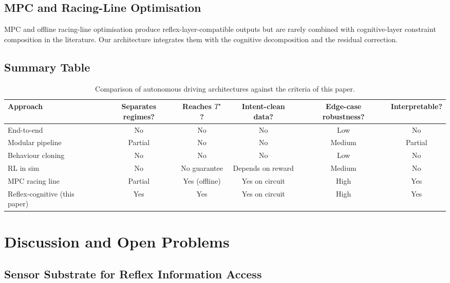 \documentclass[11pt,twocolumn]{article}
\theoremstyle{definition}
\theoremstyle{remark}
\begin{document}
\subsection{MPC and Racing-Line Optimisation}

MPC \cite{kelly2008controlvehicle,liniger2015optimization,rosolia2019learning} and offline racing-line optimisation \cite{casanova2000minimum,perantoni2014optimal,tremlett2015minimum,velenis2008minimum,aftalion2014train} produce reflex-layer-compatible outputs but are rarely combined with cognitive-layer constraint composition in the literature. Our architecture integrates them with the cognitive decomposition and the residual correction.

\subsection{Summary Table}

\begin{table}[tb]
\centering
\caption{Comparison of autonomous driving architectures against the criteria of this paper.}
\label{tab:compare}
\begin{tabular}{lccccc}
\toprule
Approach & Separates regimes? & Reaches $T^{\star}$? & Intent-clean data? & Edge-case robustness? & Interpretable? \\
\midrule
End-to-end \cite{bojarski2016endtoend} & No & No & No & Low & No \\
Modular pipeline \cite{urmson2008boss} & Partial & No & No & Medium & Partial \\
Behaviour cloning \cite{codevilla2018endtoend} & No & No & No & Low & No \\
RL in sim \cite{kendall2019learning} & No & No guarantee & Depends on reward & Medium & No \\
MPC racing line \cite{perantoni2014optimal} & Partial & Yes (offline) & Yes on circuit & High & Yes \\
Reflex-cognitive (this paper) & Yes & Yes & Yes on circuit & High & Yes \\
\bottomrule
\end{tabular}
\end{table}

\section{Discussion and Open Problems}
\label{sec:discussion}

\subsection{Sensor Substrate for Reflex Information Access}
\end{document}
